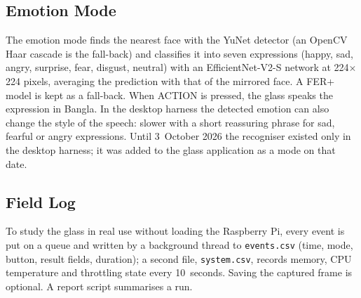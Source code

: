 \subsection{Emotion Mode}
The emotion mode finds the nearest face with the YuNet detector \cite{yunet} (an OpenCV Haar cascade is the fall-back) and classifies it into seven expressions (happy, sad, angry, surprise, fear, disgust, neutral) with an EfficientNet-V2-S network \cite{efficientnetv2} at 224$\times$224 pixels, averaging the prediction with that of the mirrored face. A FER+ model \cite{ferplus} is kept as a fall-back. When ACTION is pressed, the glass speaks the expression in Bangla. In the desktop harness the detected emotion can also change the style of the speech: slower with a short reassuring phrase for sad, fearful or angry expressions. Until 3~October 2026 the recogniser existed only in the desktop harness; it was added to the glass application as a mode on that date.

\subsection{Field Log}
\label{sec:fieldlog_method}
To study the glass in real use without loading the Raspberry Pi, every event is put on a queue and written by a background thread to \texttt{events.csv} (time, mode, button, result fields, duration); a second file, \texttt{system.csv}, records memory, CPU temperature and throttling state every 10~seconds. Saving the captured frame is optional. A report script summarises a run.

